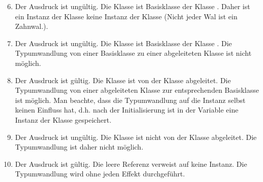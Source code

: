 \begin{frame}[t]%

\begin{enumerate}
\setcounter{enumi}{5}
\item
  Der Ausdruck ist ung\"ultig.
  Die Klasse  ist Basisklasse der Klasse .
  Daher ist ein Instanz der Klasse  keine Instanz der Klasse  (\glqq Nicht jeder Wal ist ein Zahnwal.\grqq).
\item
  Der Ausdruck ist ung\"ultig.
  Die Klasse  ist Basisklasse der Klasse .
  Die Typumwandlung von einer Basisklasse zu einer abgeleiteten Klasse ist nicht m\"oglich.
\item
  Der Ausdruck ist g\"ultig.
  Die Klasse  ist von der Klasse  abgeleitet.
  Die Typumwandlung von einer abgeleiteten Klasse zur entsprechenden Basisklasse ist m\"oglich.
  Man beachte, dass die Typumwandlung auf die Instanz selbst keinen Einfluss hat, d.h{.} nach der Initialisierung ist in der Variable  eine Instanz der Klasse  gespeichert.
\item
  Der Ausdruck ist ung\"ultig.
  Die Klasse  ist nicht von der Klasse  abgeleitet.
  Die Typumwandlung ist daher nicht m\"oglich.
\item
  Der Ausdruck ist g\"ultig. Die leere Referenz  verweist auf keine Instanz.
  Die Typumwandlung wird ohne jeden Effekt durchgef\"uhrt.
\end{enumerate}
\end{frame}

